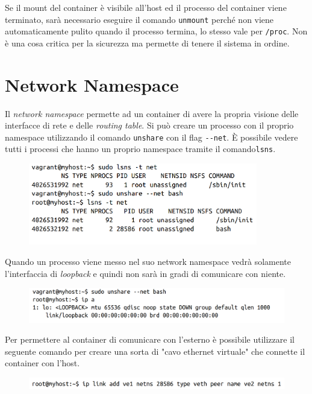 Se il mount del container è visibile all'host ed il processo del container viene
terminato, sarà necessario eseguire il comando \verb|unmount| perché non viene
automaticamente pulito quando il processo termina, lo stesso vale per \verb|/proc|.
Non è una cosa critica per la sicurezza ma permette di tenere il sistema in ordine.

\section{Network Namespace}

Il \textit{network namespace} permette ad un container di avere la propria visione
delle interfacce di rete e delle \textit{routing table}.
Si può creare un processo con il proprio namespace utilizzando il comando
\verb|unshare| con il flag \verb|--net|.
È possibile vedere tutti i processi che hanno un proprio namespace tramite
il comando\verb|lsns|.

\begin{figure}[H]
    \centering
    \includegraphics[width=10cm, keepaspectratio]{capitoli/os_security/imgs/net1.png}
\end{figure}

Quando un processo viene messo nel suo network namespace vedrà solamente l'interfaccia
di \textit{loopback} e quindi non sarà in gradi di comunicare con niente.

\begin{figure}[H]
    \centering
    \includegraphics[width=12cm, keepaspectratio]{capitoli/os_security/imgs/net2.png}
\end{figure}

Per permettere al container di comunicare con l'esterno è possibile utilizzare
il seguente comando per creare una sorta di "cavo ethernet virtuale" che connette
il container con l'host.

\begin{figure}[H]
    \centering
    \includegraphics[width=12cm, keepaspectratio]{capitoli/os_security/imgs/net3.png}
\end{figure}

